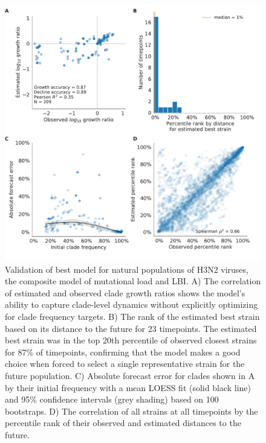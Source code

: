 \begin{figure}[H]
  \begin{center}
  \includegraphics[width=\textwidth]{figures/validation-of-best-model-for-natural-populations.pdf}
  \caption{
  Validation of best model for natural populations of H3N2 viruses, the composite model of mutational load and LBI.
  A) The correlation of estimated and observed clade growth ratios shows the model's ability to capture clade-level dynamics without explicitly optimizing for clade frequency targets.
  B) The rank of the estimated best strain based on its distance to the future for 23 timepoints.
  The estimated best strain was in the top 20th percentile of observed closest strains for 87\% of timepoints, confirming that the model makes a good choice when forced to select a single representative strain for the future population.
  C) Absolute forecast error for clades shown in A by their initial frequency with a mean LOESS fit (solid black line) and 95\% confidence intervals (grey shading) based on 100 bootstraps.
  D) The correlation of all strains at all timepoints by the percentile rank of their observed and estimated distances to the future.
  }
  \label{sup_fig:validation_of_best_model_for_natural_populations}
  \end{center}
\end{figure}


